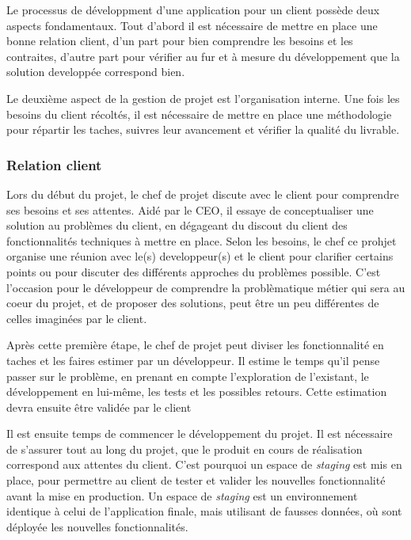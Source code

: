 Le processus de développment d'une application pour un client possède
deux aspects fondamentaux. Tout d'abord il est nécessaire de mettre en
place une bonne relation client, d'un part pour bien comprendre les
besoins et les contraites, d'autre part pour vérifier au fur et à mesure
du développement que la solution developpée correspond bien.

Le deuxième aspect de la gestion de projet est l'organisation interne.
Une fois les besoins du client récoltés, il est nécessaire de mettre en
place une méthodologie pour répartir les taches, suivres leur avancement
et vérifier la qualité du livrable.

\bigskip

\subsubsection{Relation client}\label{relation-client}

\bigskip

Lors du début du projet, le chef de projet discute avec le client pour
comprendre ses besoins et ses attentes. Aidé par le CEO, il essaye de
conceptualiser une solution au problèmes du client, en dégageant du
discout du client des fonctionnalités techniques à mettre en place.
Selon les besoins, le chef ce prohjet organise une réunion avec le(s)
developpeur(s) et le client pour clarifier certains points ou pour
discuter des différents approches du problèmes possible. C'est
l'occasion pour le développeur de comprendre la problèmatique métier qui
sera au coeur du projet, et de proposer des solutions, peut être un peu
différentes de celles imaginées par le client.

\bigskip

Après cette première étape, le chef de projet peut diviser les
fonctionnalité en taches et les faires estimer par un développeur. Il
estime le temps qu'il pense passer sur le problème, en prenant en compte
l'exploration de l'existant, le développement en lui-même, les tests et
les possibles retours. Cette estimation devra ensuite être validée par
le client

\bigskip

Il est ensuite temps de commencer le développement du projet. Il est
nécessaire de s'assurer tout au long du projet, que le produit en cours
de réalisation correspond aux attentes du client. C'est pourquoi un
espace de \emph{staging} est mis en place, pour permettre au client de
tester et valider les nouvelles fonctionnalité avant la mise en
production. Un espace de \emph{staging} est un environnement identique à
celui de l'application finale, mais utilisant de fausses données, où
sont déployée les nouvelles fonctionnalités.

